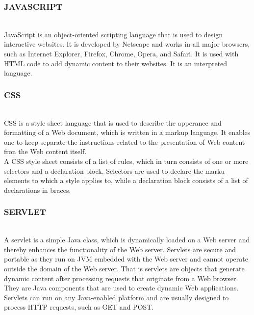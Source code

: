 \documentclass[12pt,a4paper]{article}
\begin{document}
\newpage
\subsubsection{JAVASCRIPT}
\\
\hspace{0.7 cm} JavaScript is an object-oriented scripting language that is used to design interactive websites. It is developed by Netscape and works in all major browsers, such as Internet Explorer, Firefox, Chrome, Opera, and Safari. It is used with HTML code to add dynamic content to their websites. It is an interpreted language.
\\

\newpage
\subsubsection{CSS}
\\
\hspace{0.7 cm} CSS is a style sheet language that is used to describe the apperance and formatting of a Web document, which is written in a markup language. It enables one to keep separate the instructions related to the presentation of Web content fron the Web content itself.
\\
\hspace{0.7 cm}A CSS style sheet consists of a list of rules, which in turn consists of one or more selectors and a declaration block. Selectors are used to declare the marku elements to which a style applies to, while a declaration block consists of a list of declarations in braces.
\\

\newpage
\subsubsection{SERVLET}
\\
\hspace{0.7 cm} A servlet is a simple Java class, which is dynamically loaded on a Web server and thereby enhances the functionality of the Web server. Servlets are secure and portable as they run on JVM embedded with the Web server and cannot operate outside the domain of the Web server. That is servlets are objects that generate dynamic content after processing requests that originate from a Web browser. They are Java components that are used to create dynamic Web applications. Servlets can run on any Java-enabled platform and are usually designed to process HTTP requests, such as GET and POST.
\\
\end{document}
